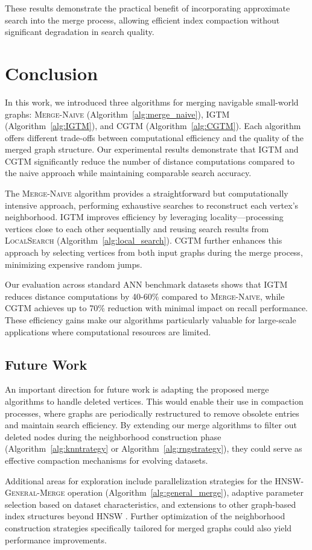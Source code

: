 \documentclass{article}
\begin{document}
These results demonstrate the practical benefit of incorporating approximate search into the merge process, allowing efficient index compaction without significant degradation in search quality.

\section{Conclusion}

In this work, we introduced three algorithms for merging navigable small-world graphs: \textsc{Merge-Naive} (Algorithm~\ref{alg:merge_naive}), \textsc{IGTM} (Algorithm~\ref{alg:IGTM}), and \textsc{CGTM} (Algorithm~\ref{alg:CGTM}). Each algorithm offers different trade-offs between computational efficiency and the quality of the merged graph structure. Our experimental results demonstrate that \textsc{IGTM} and \textsc{CGTM} significantly reduce the number of distance computations compared to the naive approach while maintaining comparable search accuracy.

The \textsc{Merge-Naive} algorithm provides a straightforward but computationally intensive approach, performing exhaustive searches to reconstruct each vertex's neighborhood. \textsc{IGTM} improves efficiency by leveraging locality—processing vertices close to each other sequentially and reusing search results from \textsc{LocalSearch} (Algorithm~\ref{alg:local_search}). \textsc{CGTM} further enhances this approach by selecting vertices from both input graphs during the merge process, minimizing expensive random jumps.

Our evaluation across standard ANN benchmark datasets shows that \textsc{IGTM} reduces distance computations by 40-60\% compared to \textsc{Merge-Naive}, while \textsc{CGTM} achieves up to 70\% reduction with minimal impact on recall performance. These efficiency gains make our algorithms particularly valuable for large-scale applications where computational resources are limited.

\subsection{Future Work}

An important direction for future work is adapting the proposed merge algorithms to handle deleted vertices. This would enable their use in compaction processes, where graphs are periodically restructured to remove obsolete entries and maintain search efficiency. By extending our merge algorithms to filter out deleted nodes during the neighborhood construction phase (Algorithm~\ref{alg:knntrategy} or Algorithm~\ref{alg:rngstrategy}), they could serve as effective compaction mechanisms for evolving datasets.

Additional areas for exploration include parallelization strategies for the \textsc{HNSW-General-Merge} operation (Algorithm~\ref{alg:general_merge}), adaptive parameter selection based on dataset characteristics, and extensions to other graph-based index structures beyond HNSW \cite{hnsw}. Further optimization of the neighborhood construction strategies specifically tailored for merged graphs could also yield performance improvements.



\end{document}
